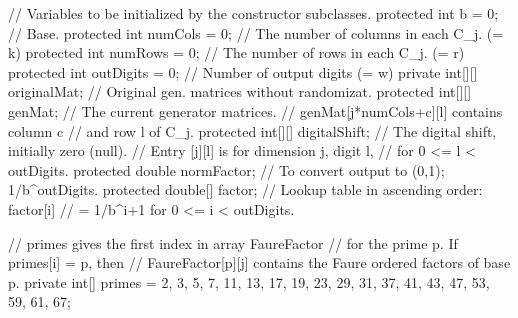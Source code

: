 \begin{code}
\begin{hide}
{   // Variables to be initialized by the constructor subclasses.
   protected int b = 0;         // Base.
   protected int numCols = 0;   // The number of columns in each C_j. (= k)
   protected int numRows = 0;   // The number of rows in each C_j. (= r)
   protected int outDigits = 0; // Number of output digits (= w)
   private int[][] originalMat; // Original gen. matrices without randomizat.
   protected int[][] genMat;    // The current generator matrices.
                                // genMat[j*numCols+c][l] contains column c
                                // and row l of C_j.
   protected int[][] digitalShift; // The digital shift, initially zero (null).
                                // Entry [j][l] is for dimension j, digit l,
                                // for 0 <= l < outDigits.
   protected double normFactor; // To convert output to (0,1); 1/b^outDigits.
   protected double[] factor;   // Lookup table in ascending order: factor[i]
                                // = 1/b^{i+1} for 0 <= i < outDigits.

   // primes gives the first index in array FaureFactor
   // for the prime p. If primes[i] = p, then
   // FaureFactor[p][j] contains the Faure ordered factors of base p.
   private int[] primes = {2, 3, 5, 7, 11, 13, 17, 19, 23, 29, 31, 37, 41,
      43, 47, 53, 59, 61, 67};

}
\end{hide}
\end{code}
